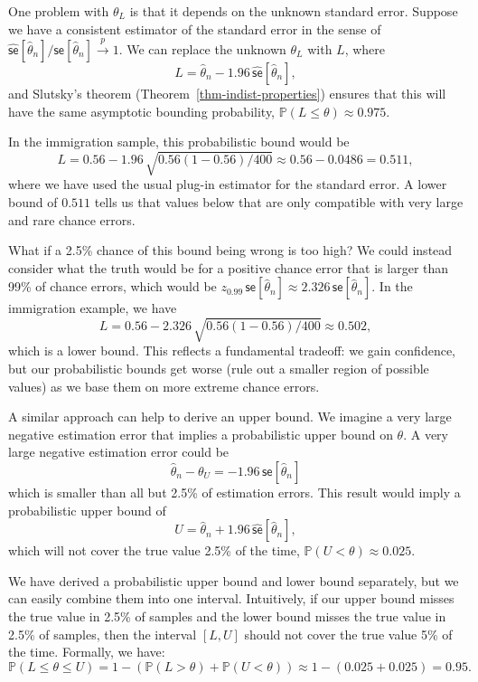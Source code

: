 \documentclass[
  13pt,
  letterpaper,
  DIV=11,
  numbers=noendperiod]{scrreprt}
\newcommand{\se}{\textsf{se}}
\renewcommand{\P}{\mathbb{P}}
\newcommand{\inprob}{\overset{p}{\to}}
\theoremstyle{plain}
\theoremstyle{plain}
\theoremstyle{definition}
\theoremstyle{definition}
\theoremstyle{remark}
\begin{document}
One problem with \(\theta_{L}\) is that it depends on the unknown
standard error. Suppose we have a consistent estimator of the standard
error in the sense of
\(\widehat{\se}[\widehat{\theta}_n] / \se[\widehat{\theta}_n] \inprob 1\).
We can replace the unknown \(\theta_{L}\) with \(L\), where \[
L = \widehat{\theta}_n - 1.96\, \widehat{\se}[\widehat{\theta}_n],
\] and Slutsky's theorem (Theorem~\ref{thm-indist-properties}) ensures
that this will have the same asymptotic bounding probability,
\(\P(L \leq \theta) \approx 0.975\).

In the immigration sample, this probabilistic bound would be \[
L = 0.56 - 1.96 \, \sqrt{0.56(1 - 0.56)/400} \approx 0.56 - 0.0486 = 0.511,
\] where we have used the usual plug-in estimator for the standard
error. A lower bound of \(0.511\) tells us that values below that are
only compatible with very large and rare chance errors.

What if a 2.5\% chance of this bound being wrong is too high? We could
instead consider what the truth would be for a positive chance error
that is larger than 99\% of chance errors, which would be
\(z_{0.99}\,\se[\widehat{\theta}_n] \approx 2.326\,\se[\widehat{\theta}_n]\).
In the immigration example, we have \[
L = 0.56 - 2.326 \, \sqrt{0.56(1 - 0.56)/400} \approx 0.502,
\] which is a lower bound. This reflects a fundamental tradeoff: we gain
confidence, but our probabilistic bounds get worse (rule out a smaller
region of possible values) as we base them on more extreme chance
errors.

A similar approach can help to derive an upper bound. We imagine a very
large negative estimation error that implies a probabilistic upper bound
on \(\theta\). A very large negative estimation error could be \[
\widehat{\theta}_n - \theta_U = -1.96 \, \se[\widehat{\theta}_n]
\] which is smaller than all but 2.5\% of estimation errors. This result
would imply a probabilistic upper bound of \[
U = \widehat{\theta}_n + 1.96 \, \widehat{\se}[\widehat{\theta}_n],
\] which will not cover the true value 2.5\% of the time,
\(\P(U < \theta) \approx 0.025\).

We have derived a probabilistic upper bound and lower bound separately,
but we can easily combine them into one interval. Intuitively, if our
upper bound misses the true value in 2.5\% of samples and the lower
bound misses the true value in 2.5\% of samples, then the interval
\([L, U]\) should not cover the true value 5\% of the time. Formally, we
have: \[
\P(L \leq \theta \leq U) = 1 - \left(\P(L > \theta) + \P(U < \theta)\right) \approx 1 - (0.025 + 0.025) = 0.95.
\]
\end{document}
